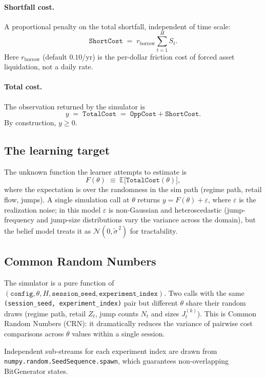 \documentclass[11pt]{article}
\newcommand{\Normal}{\mathcal{N}}
\newcommand{\Ex}{\mathbb{E}}
\newcommand{\Cstar}{\theta}
\newcommand{\sigTilde}{\tilde{\sigma}}
\newcommand{\code}[1]{\texttt{#1}}
\begin{document}
\paragraph{Shortfall cost.} A proportional penalty on the total shortfall,
independent of time scale:
\[
  \code{ShortCost} \;=\; r_{\mathrm{borrow}} \sum_{t=1}^{H} S_t.
\]
Here $r_{\mathrm{borrow}}$ (default $0.10$/yr) is the per-dollar friction
cost of forced asset liquidation, not a daily rate.

\paragraph{Total cost.} The observation returned by the simulator is
\[
  y \;=\; \code{TotalCost} \;=\; \code{OppCost} + \code{ShortCost}.
\]
By construction, $y \geq 0$.

\subsection{The learning target}
\label{sec:sim:target}

The unknown function the learner attempts to estimate is
\[
  F(\Cstar) \;\equiv\; \Ex\bigl[\code{TotalCost}(\Cstar)\bigr],
\]
where the expectation is over the randomness in the sim path (regime path,
retail flow, jumps). A single simulation call at $\Cstar$ returns
$y = F(\Cstar) + \varepsilon$, where $\varepsilon$ is the realization noise;
in this model $\varepsilon$ is non-Gaussian and heteroscedastic
(jump-frequency and jump-size distributions vary the variance across the
domain), but the belief model treats it as $\Normal(0, \sigTilde^{\,2})$ for
tractability.

\subsection{Common Random Numbers}
\label{sec:sim:crn}

The simulator is a pure function of $(\code{config}, \Cstar, H,
\code{session\_seed}, \code{experiment\_index})$. Two calls with the same
\code{(session\_seed, experiment\_index)} pair but different $\Cstar$ share
their random draws (regime path, retail $Z_t$, jump counts $N_t$ and sizes
$J^{(k)}_t$). This is Common Random Numbers (CRN): it dramatically reduces
the variance of pairwise cost comparisons across $\Cstar$ values within a
single session.

Independent sub-streams for each experiment index are drawn from
\code{numpy.random.SeedSequence.spawn}, which guarantees non-overlapping
BitGenerator states.
\end{document}
